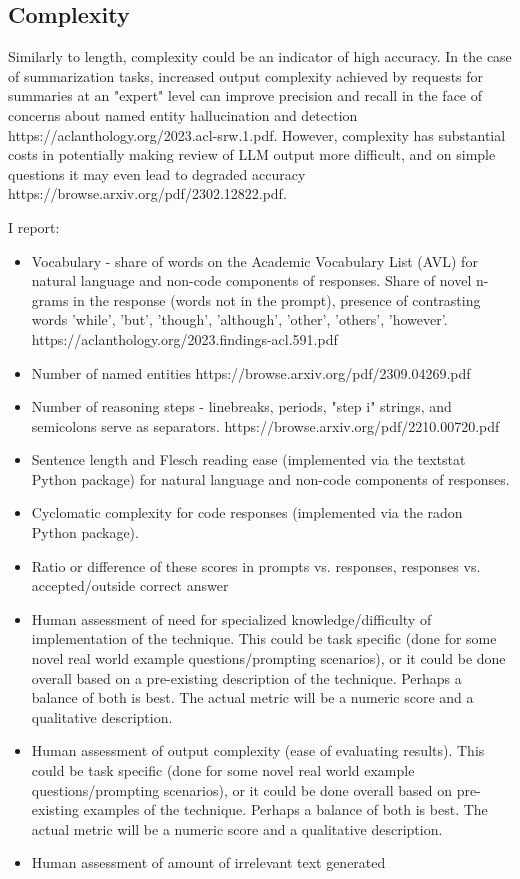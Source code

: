 \documentclass[11pt]{article}
\begin{document}
\subsection*{Complexity}

Similarly to length, complexity could be an indicator of high accuracy. In the case of summarization tasks, increased output complexity achieved by requests for summaries at an "expert" level can improve precision and recall in the face of concerns about named entity hallucination and detection https://aclanthology.org/2023.acl-srw.1.pdf. However, complexity has substantial costs in potentially making review of LLM output more difficult, and on simple questions it may even lead to degraded accuracy https://browse.arxiv.org/pdf/2302.12822.pdf. 

I report:

\begin{itemize}
  \item Vocabulary - share of words on the Academic Vocabulary List (AVL) for natural language and non-code components of responses. \cite{gardner_new_2014} Share of novel n-grams in the response (words not in the prompt), presence of contrasting words {'while', 'but', 'though', 'although', 'other', 'others', 'however'}. https://aclanthology.org/2023.findings-acl.591.pdf
  \item Number of named entities https://browse.arxiv.org/pdf/2309.04269.pdf
  \item Number of reasoning steps - linebreaks, periods, "step i" strings, and semicolons serve as separators. https://browse.arxiv.org/pdf/2210.00720.pdf
  \item Sentence length and Flesch reading ease (implemented via the textstat Python package) for natural language and non-code components of responses. \cite{flesch_how_2016, aggarwal_textstat_nodate}
  \item Cyclomatic complexity for code responses (implemented via the radon Python package). \cite{lacchia_radon_nodate}
  \item Ratio or difference of these scores in prompts vs. responses, responses vs. accepted/outside correct answer
  \item Human assessment of need for specialized knowledge/difficulty of implementation of the technique. This could be task specific (done for some novel real world example questions/prompting scenarios), or it could be done overall based on a pre-existing description of the technique. Perhaps a balance of both is best. The actual metric will be a numeric score and a qualitative description.
  \item Human assessment of output complexity (ease of evaluating results). This could be task specific (done for some novel real world example questions/prompting scenarios), or it could be done overall based on pre-existing examples of the technique. Perhaps a balance of both is best. The actual metric will be a numeric score and a qualitative description.
  \item Human assessment of amount of irrelevant text generated
\end{itemize}
\end{document}
